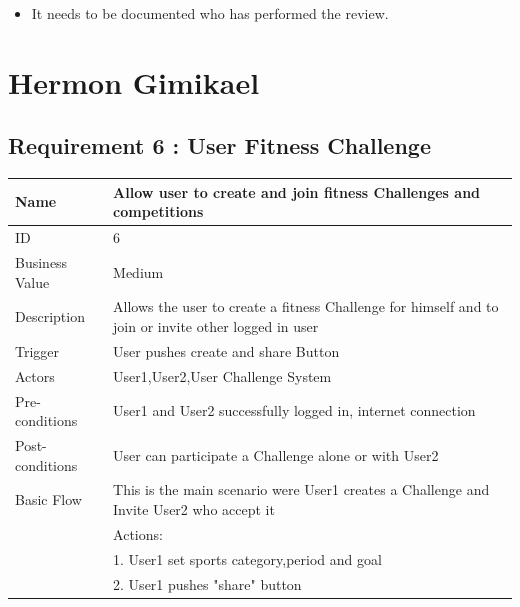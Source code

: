 \documentclass{article}
\begin{document}
\begin{itemize}
\item
  It needs to be documented who has performed the review.
\end{itemize}
\newpage

\section{Hermon Gimikael}
\subsection{Requirement 6 : User Fitness Challenge}

\begin{table}[h!]
    \begin{tabularx}{\textwidth}{|>{\raggedright\arraybackslash}p{}|X|}
        \hline
        Name             & Allow user to create and join fitness Challenges and competitions                               \\ \hline
        ID               & 6                                                                                   \\ \hline
        Business Value   & Medium                                                                                  \\ \hline
        Description      & Allows the user to create a fitness Challenge for himself and to join or invite other logged in user\\ \hline
        Trigger          & User pushes create and share Button \\ \hline
        Actors           & User1,User2,User Challenge System                        \\ \hline
        Pre-conditions   & User1 and User2 successfully logged in, internet connection                                  \\ \hline
        Post-conditions  & User can participate a Challenge alone or with User2                                                        \\ \hline
        Basic Flow       & This is the main scenario were User1 creates a Challenge and Invite User2 who accept it\\ \hline
                         & Actions: \\
                         & 1. User1 set sports category,period and goal\\
                         & 2. User1 pushes "share" button \\

\end{tabularx}
\end{table}
\end{document}
